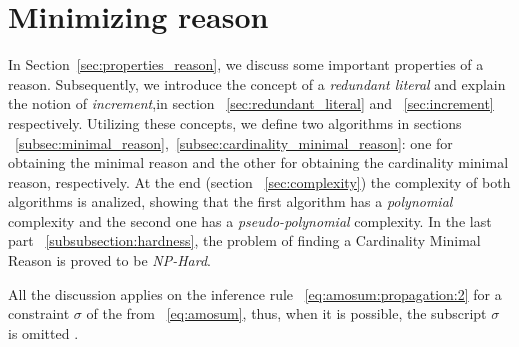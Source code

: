 \chapter{Minimizing reason}
\label{cp:minimizing_reason}
In Section~\ref{sec:properties_reason},
we  discuss some important properties of a reason. Subsequently,
we introduce the concept of a \textit{redundant literal}
and explain the notion of \textit{increment},in section ~\ref{sec:redundant_literal} and ~\ref{sec:increment} respectively.
Utilizing these concepts,
we define two algorithms in sections ~\ref{subsec:minimal_reason},~\ref{subsec:cardinality_minimal_reason}: one for obtaining 
the minimal reason and the other for obtaining the cardinality minimal reason, respectively.
At the end (section ~\ref{sec:complexity}) the complexity of both algorithms is analized, showing that
the first algorithm has a \textit{polynomial} complexity and the second one has a \textit{pseudo-polynomial}
complexity.
In the last part ~\ref{subsubsection:hardness}, the
problem of finding a Cardinality Minimal Reason is proved to be \textit{NP-Hard}. 

All the discussion applies on the inference rule ~\eqref{eq:amosum:propagation:2} for a constraint $\sigma$ of the from ~\eqref{eq:amosum}, thus, when it is possible, the subscript 
${\sigma}$ is omitted .


